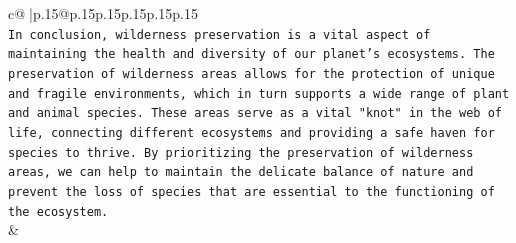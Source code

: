 \documentclass{article}
\begin{document}
{\begin{supertabular}{c@{$\;$}|p{.15\linewidth}@{}p{.15\linewidth}p{.15\linewidth}p{.15\linewidth}p{.15\linewidth}p{.15\linewidth}}
{{{\\ 
\texttt{In conclusion, wilderness preservation is a vital aspect of maintaining the health and diversity of our planet's ecosystems. The preservation of wilderness areas allows for the protection of unique and fragile environments, which in turn supports a wide range of plant and animal species. These areas serve as a vital "knot" in the web of life, connecting different ecosystems and providing a safe haven for species to thrive. By prioritizing the preservation of wilderness areas, we can help to maintain the delicate balance of nature and prevent the loss of species that are essential to the functioning of the ecosystem.} \\
            }
        }
    }
    & \\ \\


\end{supertabular}}
\end{document}
